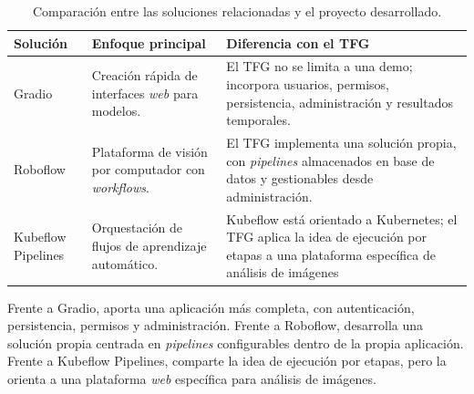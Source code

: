 \begin{table}[htbp]
	\centering
	\small
	\begin{tabular}{p{} p{} p{}}
		\toprule
		\textbf{Solución} & \textbf{Enfoque principal} & \textbf{Diferencia con el TFG} \\
		\midrule
		Gradio & Creación rápida de interfaces \textit{web} para modelos. & El TFG no se limita a una demo; incorpora usuarios, permisos, persistencia, administración y resultados temporales. \\
		\midrule
		Roboflow & Plataforma de visión por computador con \textit{workflows}. & El TFG implementa una solución propia, con \textit{pipelines} almacenados en base de datos y gestionables desde administración. \\
		\midrule
		Kubeflow Pipelines & Orquestación de flujos de aprendizaje automático. & Kubeflow está orientado a Kubernetes; el TFG aplica la idea de ejecución por etapas a una plataforma específica de análisis de imágenes\\
		\bottomrule
	\end{tabular}
	\caption[Comparación con trabajos relacionados.]{Comparación entre las soluciones relacionadas y el proyecto desarrollado.}
	\label{tabla:trabajos-relacionados}
\end{table}

Frente a Gradio, aporta una aplicación más completa, con autenticación, persistencia, permisos y administración. Frente a Roboflow, desarrolla una solución propia centrada en \textit{pipelines} configurables dentro de la propia aplicación. Frente a Kubeflow Pipelines, comparte la idea de ejecución por etapas, pero la orienta a una plataforma \textit{web} específica para análisis de imágenes.

